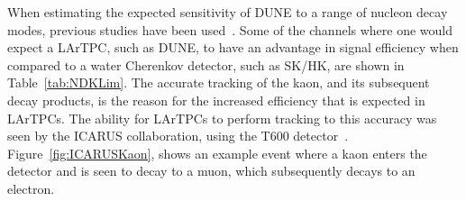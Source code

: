 When estimating the expected sensitivity of DUNE to a range of nucleon decay modes, previous studies have been used~\citep{Bueno, Klinger:2015kva}. Some of the channels where one would expect a LArTPC, such as DUNE, to have an advantage in signal efficiency when compared to a water Cherenkov detector, such as SK/HK, are shown in Table~\ref{tab:NDKLim}. The accurate tracking of the kaon, and its subsequent decay products, is the reason for the increased efficiency that is expected in LArTPCs. The ability for LArTPCs to perform tracking to this accuracy was seen by the ICARUS collaboration, using the T600 detector~\citep{PMTrack}. Figure~\ref{fig:ICARUSKaon}, shows an example event where a kaon enters the detector and is seen to decay to a muon, which subsequently decays to an electron. \\

